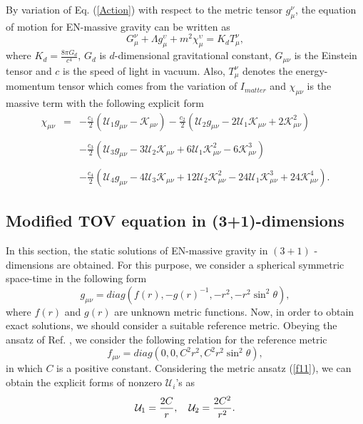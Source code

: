 \documentclass[aps]{revtex4}
\begin{document}
By variation of Eq. (\ref{Action}) with respect to the metric tensor $g_{\mu
}^{\nu }$, the equation of motion for EN-massive gravity can be written as%
\begin{equation}
G_{\mu }^{\nu }+\Lambda g_{\mu }^{\upsilon }+m^{2}\chi _{\mu }^{\upsilon
}=K_{d}T_{\mu }^{\nu },  \label{Field equation}
\end{equation}%
where $K_{d}=\frac{8\pi G_{d}}{c^{4}}$, $G_{d}$ is $d$-dimensional
gravitational constant, $G_{\mu \nu }$ is the Einstein tensor and $c$ is the
speed of light in vacuum. Also, $T_{\mu }^{\nu }$ denotes the
energy-momentum tensor which comes from the variation of $I_{matter}$ and $%
\chi _{\mu \nu }$ is the massive term with the following explicit form
\begin{eqnarray}
\chi _{\mu \nu } &=&-\frac{c_{1}}{2}\left( \mathcal{U}_{1}g_{\mu \nu }-%
\mathcal{K}_{\mu \nu }\right) -\frac{c_{2}}{2}\left( \mathcal{U}_{2}g_{\mu
\nu }-2\mathcal{U}_{1}\mathcal{K}_{\mu \nu }+2\mathcal{K}_{\mu \nu
}^{2}\right)  \nonumber \\
&&  \nonumber \\
&&-\frac{c_{3}}{2}(\mathcal{U}_{3}g_{\mu \nu }-3\mathcal{U}_{2}\mathcal{K}%
_{\mu \nu }+6\mathcal{U}_{1}\mathcal{K}_{\mu \nu }^{2}-6\mathcal{K}_{\mu \nu
}^{3})  \nonumber \\
&&  \nonumber \\
&&-\frac{c_{4}}{2}\left( \mathcal{U}_{4}g_{\mu \nu }-4\mathcal{U}_{3}%
\mathcal{K}_{\mu \nu }+12\mathcal{U}_{2}\mathcal{K}_{\mu \nu }^{2}-24%
\mathcal{U}_{1}\mathcal{K}_{\mu \nu }^{3}+24\mathcal{K}_{\mu \nu
}^{4}\right) .
\end{eqnarray}

\subsection{Modified TOV equation in (3+1)-dimensions}

In this section, the static solutions of EN-massive gravity in $(3+1)$%
-dimensions are obtained. For this purpose, we consider a
spherical symmetric space-time in the following form
\begin{equation}
g_{\mu \nu }=diag\left( f(r),-g(r)^{-1},-r^{2},-r^{2}\sin ^{2} \theta
\right) ,  \label{Metric}
\end{equation}%
where $f(r)$ and $g(r)$ are unknown metric functions. Now, in
order to obtain exact solutions, we should consider a suitable
reference metric. Obeying the ansatz of Ref. \cite{CaiHPZ}, we
consider the following relation for the reference metric
\begin{equation}
f_{\mu \nu }=diag(0,0,C^{2}r^{2},C^{2}r^{2}\sin ^{2} \theta ),  \label{f11}
\end{equation}
in which $C$ is a positive constant. Considering the metric ansatz
(\ref{f11}), we can obtain the explicit forms of nonzero
$\mathcal{U}_{i}$'s as \cite{CaiHPZ}
\begin{equation}
\mathcal{U}_{1}=\frac{2C}{r},\text{ \ \
}\mathcal{U}_{2}=\frac{2C^{2}}{r^{2}}.  \nonumber
\end{equation}
\end{document}
